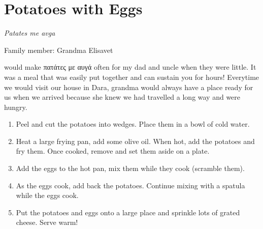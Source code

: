 \chapter{Potatoes with Eggs}
\label{ch:eggswithpotatoes}


\textit{Patates me avga}

Family member: Grandma Elisavet

 would make \textgreek{πατάτες με αυγά} often for my dad and uncle when they were little. It was a meal that was easily put together and can sustain you for hours! Everytime we would visit our house in Dara, grandma would always have a place ready for us when we arrived because she knew we had travelled a long way and were hungry.

\begin{enumerate}
    \item Peel and cut the potatoes into wedges. Place them in a bowl of cold water.
    \item Heat a large frying pan, add some olive oil. When hot, add the potatoes and fry them. Once cooked, remove and set them aside on a plate.
    \item Add the eggs to the hot pan, mix them while they cook (scramble them). 
    \item As the eggs cook, add back the potatoes. Continue mixing with a spatula while the eggs cook.
    \item Put the potatoes and eggs onto a large place and sprinkle lots of grated cheese. Serve warm!
\end{enumerate}



